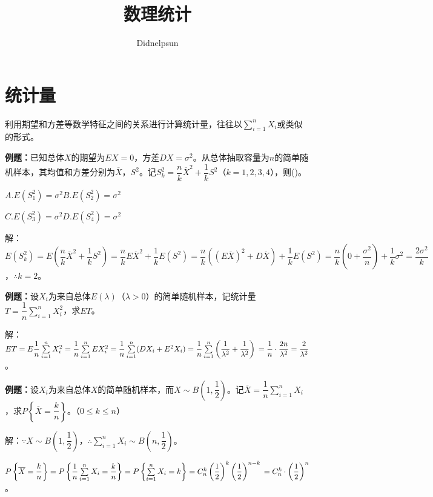 \documentclass[UTF8, 12pt]{ctexart}
\author{Didnelpsun}
\title{数理统计}
\date{}
\begin{document}
\maketitle
\pagestyle{empty}
\thispagestyle{empty}
\tableofcontents
\thispagestyle{empty}
\newpage
\pagestyle{plain}
\setcounter{page}{1}
\section{统计量}

利用期望和方差等数学特征之间的关系进行计算统计量，往往以$\sum\limits_{i=1}^nX_i$或类似的形式。

\textbf{例题：}已知总体$X$的期望为$EX=0$，方差$DX=\sigma^2$。从总体抽取容量为$n$的简单随机样本，其均值和方差分别为$\overline{X}$，$S^2$。记$S_k^2=\dfrac{n}{k}\overline{X}^2+\dfrac{1}{k}S^2$（$k=1,2,3,4$），则()。

$A.E(S_1^2)=\sigma^2$\qquad$B.E(S_2^2)=\sigma^2$

$C.E(S_3^2)=\sigma^2$\qquad$D.E(S_4^2)=\sigma^2$

解：$E(S_k^2)=E\left(\dfrac{n}{k}\overline{X}^2+\dfrac{1}{k}S^2\right)=\dfrac{n}{k}E\overline{X}^2+\dfrac{1}{k}E(S^2)=\dfrac{n}{k}((E\overline{X})^2+D\overline{X})+\dfrac{1}{k}E(S^2)=\dfrac{n}{k}\left(0+\dfrac{\sigma^2}{n}\right)+\dfrac{1}{k}\sigma^2=\dfrac{2\sigma^2}{k}$，$\therefore k=2$。

\textbf{例题：}设$X_i$为来自总体$E(\lambda)$（$\lambda>0$）的简单随机样本，记统计量$T=\dfrac{1}{n}\sum\limits_{i=1}^nX_i^2$，求$ET$。

解：$ET=E\dfrac{1}{n}\sum\limits_{i=1}^nX_i^2=\dfrac{1}{n}\sum\limits_{i=1}^nEX_i^2=\dfrac{1}{n}\sum\limits_{i=1}^n(DX_i+E^2X_i)=\dfrac{1}{n}\sum\limits_{i=1}^n\left(\dfrac{1}{\lambda^2}+\dfrac{1}{\lambda^2}\right)\\=\dfrac{1}{n}\cdot\dfrac{2n}{\lambda^2}=\dfrac{2}{\lambda^2}$。

\textbf{例题：}设$X_i$为来自总体$X$的简单随机样本，而$X\sim B\left(1,\dfrac{1}{2}\right)$。记$\overline{X}=\dfrac{1}{n}\sum\limits_{i=1}^nX_i$，求$P\left\{\overline{X}=\dfrac{k}{n}\right\}$。（$0\leqslant k\leqslant n$）

解：$\because X\sim B\left(1,\dfrac{1}{2}\right)$，$\therefore\sum\limits_{i=1}^nX_i\sim B\left(n,\dfrac{1}{2}\right)$。

$P\left\{\overline{X}=\dfrac{k}{n}\right\}=P\left\{\dfrac{1}{n}\sum\limits_{i=1}^nX_i=\dfrac{k}{n}\right\}=P\left\{\sum\limits_{i=1}^nX_i=k\right\}=C_n^k\left(\dfrac{1}{2}\right)^k\left(\dfrac{1}{2}\right)^{n-k}\\=C_n^k\cdot\left(\dfrac{1}{2}\right)^n$。
\end{document}
